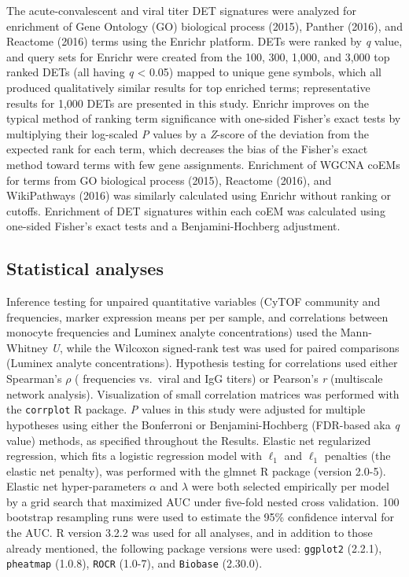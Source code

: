 The acute-convalescent and viral titer DET signatures were analyzed for enrichment of Gene Ontology (GO) biological process\autocite{GOC2015} (2015), Panther\autocite{Mi2013} (2016), and Reactome\autocite{Fabregat2016} (2016) terms using the Enrichr platform.\autocite{Chen2013} DETs were ranked by \emph{q} value, and query sets for Enrichr were created from the 100, 300, 1,000, and 3,000 top ranked DETs (all having \emph{q} < 0.05) mapped to unique gene symbols, which all produced qualitatively similar results for top enriched terms; representative results for 1,000 DETs are presented in this study. Enrichr improves on the typical method of ranking term significance with one-sided Fisher’s exact tests by multiplying their log-scaled \emph{P} values by a \emph{Z}-score of the deviation from the expected rank for each term, which decreases the bias of the Fisher’s exact method toward terms with few gene assignments.\autocite{Chen2013} Enrichment of WGCNA coEMs for terms from GO biological process (2015), Reactome (2016), and WikiPathways\autocite{Kutmon2016} (2016) was similarly calculated using Enrichr without ranking or cutoffs. Enrichment of DET signatures within each coEM was calculated using one-sided Fisher’s exact tests and a Benjamini-Hochberg adjustment.

\subsection{Statistical analyses}

Inference testing for unpaired quantitative variables (CyTOF community and \subcommunity{} frequencies, marker expression means per \subcommunity{} per sample, and correlations between monocyte \subcommunity{} frequencies and Luminex analyte concentrations) used the Mann-Whitney \emph{U}, while the Wilcoxon signed-rank test was used for paired comparisons (Luminex analyte concentrations). Hypothesis testing for correlations used either Spearman's $\rho$ (\subcommunity{} frequencies vs.\ viral and IgG titers) or Pearson’s \emph{r} (multiscale network analysis). Visualization of small correlation matrices was performed with the \texttt{corrplot} R package. \emph{P} values in this study were adjusted for multiple hypotheses using either the Bonferroni or Benjamini-Hochberg (FDR-based aka \emph{q} value) methods, as specified throughout the Results. Elastic net regularized regression, which fits a logistic regression model with $\ell_1$ and $\ell_1$ penalties (the elastic net penalty), was performed with the glmnet\autocite{Friedman2010} R package (version 2.0-5). Elastic net hyper-parameters $\alpha$ and $\lambda$ were both selected empirically per model by a grid search that maximized AUC under five-fold nested cross validation. 100 bootstrap resampling runs were used to estimate the 95\% confidence interval for the AUC. R version 3.2.2 was used for all analyses, and in addition to those already mentioned, the following package versions were used: \texttt{ggplot2} (2.2.1), \texttt{pheatmap} (1.0.8), \texttt{ROCR}\autocite{Sing2005} (1.0-7), and \texttt{Biobase} (2.30.0).

